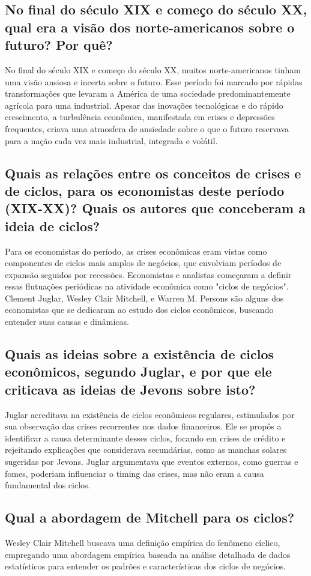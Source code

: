 \documentclass[a4paper,12pt]{article}[abntex2]
\begin{document}
\subsection{\textbf{No final do século XIX e começo do século XX, qual era a visão dos norte-americanos sobre o futuro? Por quê?}}
No final do século XIX e começo do século XX, muitos norte-americanos tinham uma visão ansiosa e incerta sobre o futuro. Esse período foi marcado por rápidas transformações que levaram a América de uma sociedade predominantemente agrícola para uma industrial. Apesar das inovações tecnológicas e do rápido crescimento, a turbulência econômica, manifestada em crises e depressões frequentes, criava uma atmosfera de ansiedade sobre o que o futuro reservava para a nação cada vez mais industrial, integrada e volátil.
\subsection{\textbf{Quais as relações entre os conceitos de crises e de ciclos, para os economistas deste período (XIX-XX)? Quais os autores que conceberam a ideia de ciclos?}}
Para os economistas do período, as crises econômicas eram vistas como componentes de ciclos mais amplos de negócios, que envolviam períodos de expansão seguidos por recessões. Economistas e analistas começaram a definir essas flutuações periódicas na atividade econômica como "ciclos de negócios". Clement Juglar, Wesley Clair Mitchell, e Warren M. Persons são alguns dos economistas que se dedicaram ao estudo dos ciclos econômicos, buscando entender suas causas e dinâmicas.
\subsection{\textbf{Quais as ideias sobre a existência de ciclos econômicos, segundo Juglar, e por que ele criticava as ideias de Jevons sobre isto?}}
Juglar acreditava na existência de ciclos econômicos regulares, estimulados por sua observação das crises recorrentes nos dados financeiros. Ele se propôs a identificar a causa determinante desses ciclos, focando em crises de crédito e rejeitando explicações que considerava secundárias, como as manchas solares sugeridas por Jevons. Juglar argumentava que eventos externos, como guerras e fomes, poderiam influenciar o timing das crises, mas não eram a causa fundamental dos ciclos.
\subsection{\textbf{Qual a abordagem de Mitchell para os ciclos?}}
Wesley Clair Mitchell buscava uma definição empírica do fenômeno cíclico, empregando uma abordagem empírica baseada na análise detalhada de dados estatísticos para entender os padrões e características dos ciclos de negócios.
\end{document}
